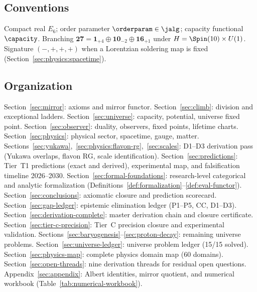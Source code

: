 \subsection{Conventions}

Compact real $E_6$; order parameter $\orderparam\in\jalg$; capacity functional
$\capacity$. Branching $\mathbf{27}=\mathbf{1}_{+4}\oplus\mathbf{10}_{-2}\oplus\mathbf{16}_{+1}$
under $H=\Spin(10)\times U(1)$. Signature $(-,+,+,+)$ when a Lorentzian
soldering map is fixed (Section~\ref{sec:physics:spacetime}).

\subsection{Organization}

Section~\ref{sec:mirror}: axioms and mirror functor.
Section~\ref{sec:climb}: division and exceptional ladders.
Section~\ref{sec:universe}: capacity, potential, universe fixed point.
Section~\ref{sec:observer}: duality, observers, fixed points, lifetime charts.
Section~\ref{sec:physics}: physical sector, spacetime, gauge, matter.
Sections~\ref{sec:yukawa},~\ref{sec:physics:flavon-rg},~\ref{sec:scales}:
D1--D3 derivation pass (Yukawa overlaps, flavon RG, scale identification).
Section~\ref{sec:predictions}: Tier~T1 predictions (exact and derived),
experimental map, and falsification timeline 2026--2030.
Section~\ref{sec:formal-foundations}: research-level categorical and analytic
formalization (Definitions~\ref{def:formalization}--\ref{def:eval-functor}).
Section~\ref{sec:conclusions}: axiomatic closure and prediction scorecard.
Section~\ref{sec:gap-ledger}: epistemic elimination ledger (P1--P5, CC, D1--D3).
Section~\ref{sec:derivation-complete}: master derivation chain and closure certificate.
Section~\ref{sec:tier-c-precision}: Tier~C precision closure and experimental validation.
Sections~\ref{sec:baryogenesis}--\ref{sec:proton-decay}: remaining universe problems.
Section~\ref{sec:universe-ledger}: universe problem ledger (15/15 solved).
Section~\ref{sec:physics-map}: complete physics domain map (60 domains).
Section~\ref{sec:open-threads}: nine derivation threads for residual open questions.
Appendix~\ref{sec:appendix}: Albert identities, mirror quotient, and
numerical workbook (Table~\ref{tab:numerical-workbook}).